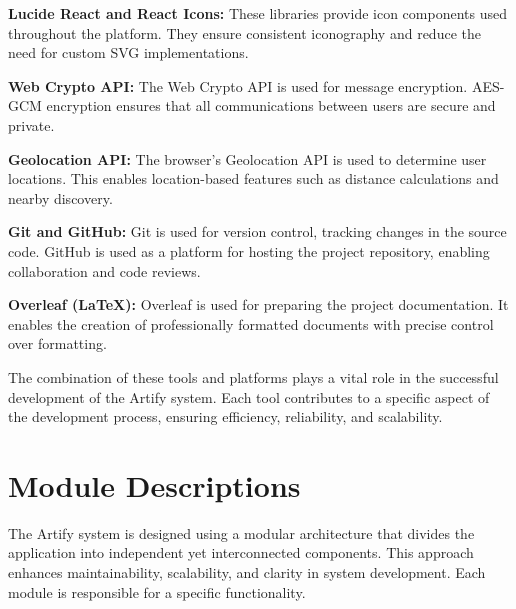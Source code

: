 \documentclass[12pt,a4paper]{report}
\begin{document}
\textbf{Lucide React and React Icons:}  
These libraries provide icon components used throughout the platform. They ensure consistent iconography and reduce the need for custom SVG implementations.

\textbf{Web Crypto API:}  
The Web Crypto API is used for message encryption. AES-GCM encryption ensures that all communications between users are secure and private.

\textbf{Geolocation API:}  
The browser's Geolocation API is used to determine user locations. This enables location-based features such as distance calculations and nearby discovery.

\textbf{Git and GitHub:}  
Git is used for version control, tracking changes in the source code. GitHub is used as a platform for hosting the project repository, enabling collaboration and code reviews.

\textbf{Overleaf (LaTeX):}  
Overleaf is used for preparing the project documentation. It enables the creation of professionally formatted documents with precise control over formatting.

The combination of these tools and platforms plays a vital role in the successful development of the Artify system. Each tool contributes to a specific aspect of the development process, ensuring efficiency, reliability, and scalability.

\setcounter{chapter}{4}
\clearpage
\thispagestyle{empty}

\noindent
{}

\clearpage
{}
\setcounter{section}{0}

\section{Module Descriptions}

The Artify system is designed using a modular architecture that divides the application into independent yet interconnected components. This approach enhances maintainability, scalability, and clarity in system development. Each module is responsible for a specific functionality.
\end{document}
